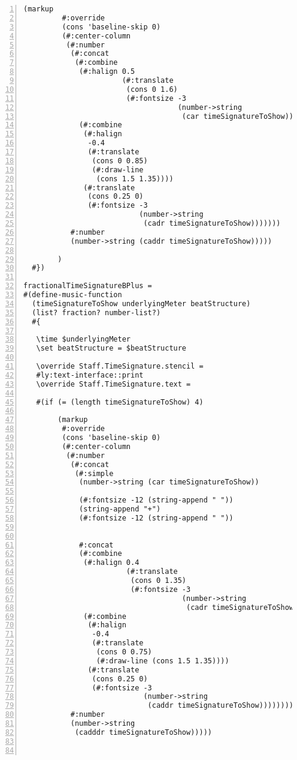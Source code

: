 \begin{Verbatim}[numbers=left,xleftmargin=5mm]
        (markup
         #:override
         (cons 'baseline-skip 0)
         (#:center-column
          (#:number
           (#:concat
            (#:combine
             (#:halign 0.5
                       (#:translate
                        (cons 0 1.6)
                        (#:fontsize -3
                                    (number->string
                                     (car timeSignatureToShow)))))
             (#:combine
              (#:halign
               -0.4
               (#:translate
                (cons 0 0.85)
                (#:draw-line
                 (cons 1.5 1.35))))
              (#:translate
               (cons 0.25 0)
               (#:fontsize -3
                           (number->string
                            (cadr timeSignatureToShow)))))))
           #:number
           (number->string (caddr timeSignatureToShow)))))

        )
  #})

fractionalTimeSignatureBPlus =
#(define-music-function
  (timeSignatureToShow underlyingMeter beatStructure)
  (list? fraction? number-list?)
  #{

   \time $underlyingMeter
   \set beatStructure = $beatStructure

   \override Staff.TimeSignature.stencil =
   #ly:text-interface::print
   \override Staff.TimeSignature.text =

   #(if (= (length timeSignatureToShow) 4)

        (markup
         #:override
         (cons 'baseline-skip 0)
         (#:center-column
          (#:number
           (#:concat
            (#:simple
             (number->string (car timeSignatureToShow))

             (#:fontsize -12 (string-append " "))
             (string-append "+")
             (#:fontsize -12 (string-append " "))


             #:concat
             (#:combine
              (#:halign 0.4
                        (#:translate
                         (cons 0 1.35)
                         (#:fontsize -3
                                     (number->string
                                      (cadr timeSignatureToShow)))))
              (#:combine
               (#:halign
                -0.4
                (#:translate
                 (cons 0 0.75)
                 (#:draw-line (cons 1.5 1.35))))
               (#:translate
                (cons 0.25 0)
                (#:fontsize -3
                            (number->string
                             (caddr timeSignatureToShow))))))))
           #:number
           (number->string
            (cadddr timeSignatureToShow)))))



\end{Verbatim}
